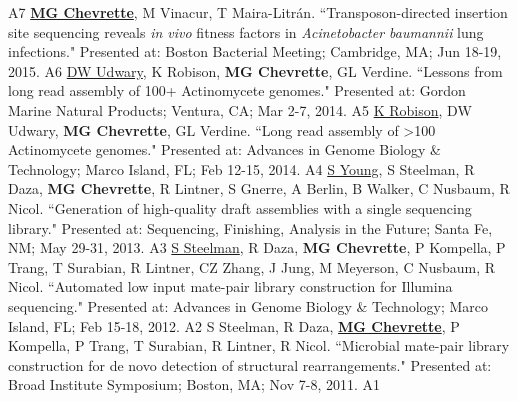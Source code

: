 \begin{cvpubs}
    {A7} %
  \cvpub
    {\textbf{\underline{MG Chevrette}}, M Vinacur, T Maira-Litr\'{a}n. ``Transposon-directed insertion site sequencing reveals \textit{in vivo} fitness factors in \textit{Acinetobacter baumannii} lung infections." Presented at: Boston Bacterial Meeting; Cambridge, MA; Jun 18-19, 2015.} %
    {A6} %
  \cvpub
    {\underline{DW Udwary}, K Robison, \textbf{MG Chevrette}, GL Verdine. ``Lessons from long read assembly of 100+ Actinomycete genomes." Presented at: Gordon Marine Natural Products; Ventura, CA; Mar 2-7, 2014.} %
    {A5} %
  \cvpub
    {\underline{K Robison}, DW Udwary, \textbf{MG Chevrette}, GL Verdine. ``Long read assembly of >100 Actinomycete genomes." Presented at: Advances in Genome Biology \& Technology; Marco Island, FL; Feb 12-15, 2014.} %
    {A4} %
  \cvpub
    {\underline{S Young}, S Steelman, R Daza, \textbf{MG Chevrette}, R Lintner, S Gnerre, A Berlin, B Walker, C Nusbaum, R Nicol. ``Generation of high-quality draft assemblies with a single sequencing library." Presented at: Sequencing, Finishing, Analysis in the Future; Santa Fe, NM; May 29-31, 2013.} %
    {A3} %
  \cvpub
    {\underline{S Steelman}, R Daza, \textbf{MG Chevrette}, P Kompella, P Trang, T Surabian, R Lintner, CZ Zhang, J Jung, M Meyerson, C Nusbaum, R Nicol. ``Automated low input mate-pair library construction for Illumina sequencing." Presented at: Advances in Genome Biology \& Technology; Marco Island, FL; Feb 15-18, 2012.} %
    {A2} %
  \cvpub
    {S Steelman, R Daza, \underline{\textbf{MG Chevrette}}, P Kompella, P Trang, T Surabian, R Lintner, R Nicol. ``Microbial mate-pair library construction for de novo detection of structural rearrangements." Presented at: Broad Institute Symposium; Boston, MA; Nov 7-8, 2011.} %
    {A1} %
\end{cvpubs}
